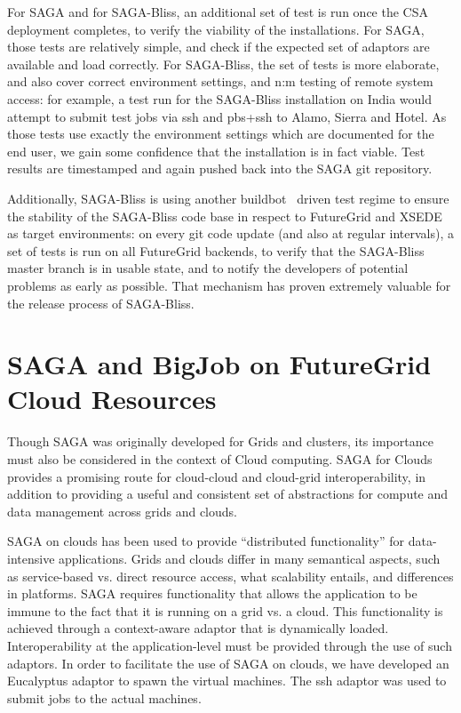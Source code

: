 \documentclass[]{paper}
\begin{document}
For SAGA and for SAGA-Bliss, an additional set of test is run once the CSA deployment completes, to verify the viability of the installations.  For SAGA, those tests are relatively simple, and check if the expected set of adaptors are available and load correctly.  For SAGA-Bliss, the set of tests is more elaborate, and also cover correct environment settings, and n:m testing of remote system access: for example, a test run for the SAGA-Bliss installation on India would attempt to submit test jobs via ssh and pbs+ssh to Alamo, Sierra and Hotel.  As those tests use exactly the environment settings which are documented for the end user, we gain some confidence that the installation is in fact viable.  Test results are timestamped and again pushed back into the SAGA git repository.

Additionally, SAGA-Bliss is using another buildbot~\cite{bliss-buildbot} driven test regime to ensure the stability of the SAGA-Bliss code base in respect to FutureGrid and XSEDE as target environments: on every git code update (and also at regular intervals), a set of tests is run on all FutureGrid backends, to verify that the SAGA-Bliss master branch is in usable state, and to notify the developers of potential problems as early as possible.  That mechanism has proven extremely valuable for the release process of SAGA-Bliss.


\section{SAGA and BigJob on FutureGrid Cloud Resources}

Though SAGA was originally developed for Grids and clusters, its importance must also be considered in the context of Cloud computing. SAGA for Clouds provides a promising route for cloud-cloud and cloud-grid interoperability, in addition to providing a useful and consistent set of abstractions for compute and data management across grids and clouds.

SAGA on clouds has been used to provide %
``distributed functionality'' for data-intensive applications. Grids and clouds differ in many semantical aspects, such as service-based vs. direct resource access, what scalability entails, and differences in platforms. SAGA requires functionality that allows the application to be immune to the fact that it is running on a grid vs. a cloud. This functionality is achieved through a context-aware adaptor that is dynamically loaded. Interoperability at the application-level must be provided through the use of such adaptors. In order to facilitate the use of SAGA on clouds, we have developed an Eucalyptus adaptor to spawn the virtual machines. The ssh adaptor was used to submit jobs to the actual machines.
\end{document}
